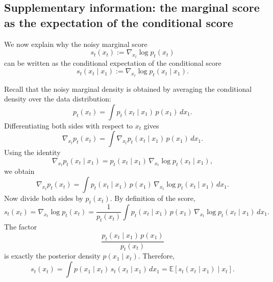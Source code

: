 \subsection{Supplementary information: the marginal score as the expectation of the conditional score}

We now explain why the noisy marginal score
\[
s_t(x_t) := \nabla_{x_t}\log p_t(x_t)
\]
can be written as the conditional expectation of the conditional score
\[
s_t(x_t\mid x_1) := \nabla_{x_t}\log p_t(x_t\mid x_1).
\]

Recall that the noisy marginal density is obtained by averaging the conditional density over the data distribution:
\begin{equation}
  p_t(x_t)
  =
  \int p_t(x_t\mid x_1)\,p(x_1)\,dx_1.
  \label{eq:marginal_density}
\end{equation}
Differentiating both sides with respect to $x_t$ gives
\begin{equation}
  \nabla_{x_t} p_t(x_t)
  =
  \int \nabla_{x_t} p_t(x_t\mid x_1)\,p(x_1)\,dx_1.
\end{equation}
Using the identity
\[
\nabla_{x_t} p_t(x_t\mid x_1)
=
p_t(x_t\mid x_1)\,\nabla_{x_t}\log p_t(x_t\mid x_1),
\]
we obtain
\begin{equation}
  \nabla_{x_t} p_t(x_t)
  =
  \int p_t(x_t\mid x_1)\,p(x_1)\,
  \nabla_{x_t}\log p_t(x_t\mid x_1)\,dx_1.
\end{equation}
Now divide both sides by $p_t(x_t)$. By definition of the score,
\begin{equation}
  s_t(x_t)
  =
  \nabla_{x_t}\log p_t(x_t)
  =
  \frac{1}{p_t(x_t)}
  \int p_t(x_t\mid x_1)\,p(x_1)\,
  \nabla_{x_t}\log p_t(x_t\mid x_1)\,dx_1.
\end{equation}
The factor
\[
\frac{p_t(x_t\mid x_1)\,p(x_1)}{p_t(x_t)}
\]
is exactly the posterior density $p(x_1\mid x_t)$. Therefore,
\begin{equation}
  s_t(x_t)
  =
  \int p(x_1\mid x_t)\,s_t(x_t\mid x_1)\,dx_1
  =
  \mathbb{E}\!\left[s_t(x_t\mid x_1)\mid x_t\right].
  \label{eq:marginal_score_as_expectation}
\end{equation}